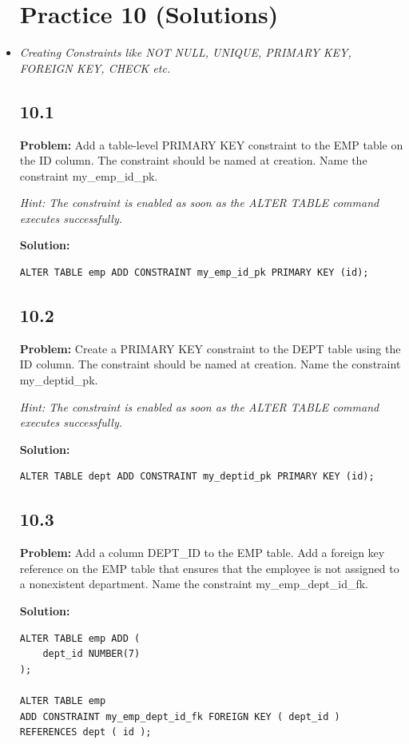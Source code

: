 \documentclass[12pt,a4paper]{article}
\begin{document}
\begin{itemize}
\section{Practice 10 (Solutions)}
\item \textit{Creating Constraints like NOT NULL, UNIQUE, PRIMARY KEY, FOREIGN KEY, CHECK etc.}
\subsection*{10.1}
\textbf{Problem:} Add a table-level PRIMARY KEY constraint to the EMP table on the ID column. The constraint should be named at creation. Name the constraint my\_emp\_id\_pk.

\textit{Hint: The constraint is enabled as soon as the ALTER TABLE command executes successfully.}

\textbf{Solution:}
\begin{lstlisting}
ALTER TABLE emp ADD CONSTRAINT my_emp_id_pk PRIMARY KEY (id);
\end{lstlisting}

\subsection*{10.2}
\textbf{Problem:} Create a PRIMARY KEY constraint to the DEPT table using the ID column. The constraint should be named at creation. Name the constraint my\_deptid\_pk.

\textit{Hint: The constraint is enabled as soon as the ALTER TABLE command executes successfully.}

\textbf{Solution:}
\begin{lstlisting}
ALTER TABLE dept ADD CONSTRAINT my_deptid_pk PRIMARY KEY (id);
\end{lstlisting}

\subsection*{10.3}
\textbf{Problem:} Add a column DEPT\_ID to the EMP table. Add a foreign key reference on the EMP table that ensures that the employee is not assigned to a nonexistent department. Name the constraint my\_emp\_dept\_id\_fk.

\textbf{Solution:}
\begin{lstlisting}
ALTER TABLE emp ADD ( 
    dept_id NUMBER(7)
);

ALTER TABLE emp
ADD CONSTRAINT my_emp_dept_id_fk FOREIGN KEY ( dept_id )
REFERENCES dept ( id );
\end{lstlisting}


\end{itemize}
\end{document}
